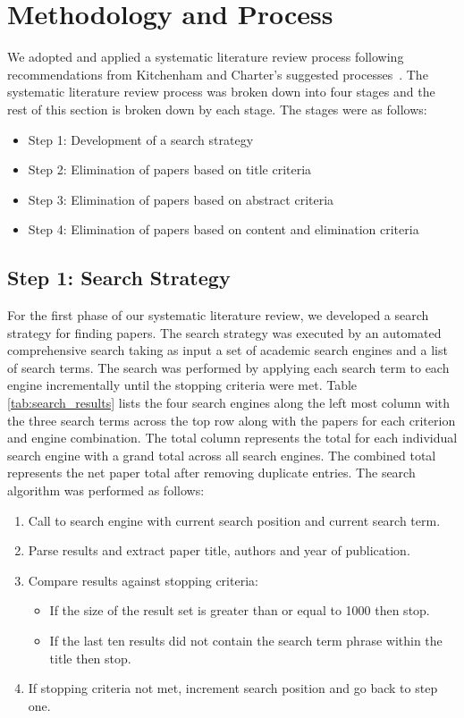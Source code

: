\section{Methodology and Process} \label{sec:process}

We adopted and applied a systematic literature review process following recommendations from Kitchenham and Charter's suggested processes~\cite{kitchenham2007guidelines}. 
The systematic literature review process was broken down into four stages and the rest of this section is broken down by each stage. 
The stages were as follows:

\begin{itemize}
\setlength{\itemsep}{0.25pt}
\item Step 1: Development of a search strategy
\item Step 2: Elimination of papers based on title criteria
\item Step 3: Elimination of papers based on abstract criteria
\item Step 4: Elimination of papers based on content and elimination criteria
\end{itemize}

\subsection{Step 1: Search Strategy}

For the first phase of our systematic literature review, we developed a search strategy for finding papers. 
The search strategy was executed by an automated comprehensive search taking as input a set of academic search engines and a list of search terms. 
The search was performed by applying each search term to each engine incrementally until the stopping criteria were met. 
Table \ref{tab:search_results} lists the four search engines along the left most column with the three search terms across the top row along with the papers for each criterion and engine combination. 
The total column represents the total for each individual search engine with a grand total across all search engines. 
The combined total represents the net paper total after removing duplicate entries. 
The search algorithm was performed as follows:

\begin{enumerate}
\setlength{\itemsep}{0.25pt}
\item Call to search engine with current search position and current search term.
\item Parse results and extract paper title, authors and year of publication.
\item Compare results against stopping criteria:
	\begin{itemize}
	\item If the size of the result set is greater than or equal to 1000 then stop.
	\item If the last ten results did not contain the search term phrase within the title then stop.
	\end{itemize}
\item If stopping criteria not met, increment search position and go back to step one.
\end{enumerate}

